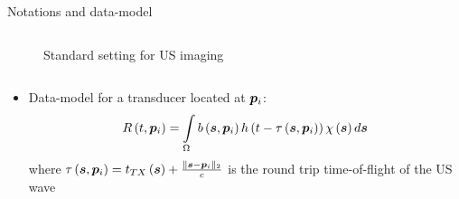 {\begin{block}{Notations and data-model}
\begin{columns}
		\begin{column}{.43\textwidth} %
			\centering
			\begin{figure}
				{\footnotesize
					}
				\caption{Standard setting for US imaging}
			\end{figure}
		\end{column}
	\end{columns} %
	
	\begin{itemize}
		\item Data-model for a transducer located at $\bm{p}_i$:
		\begin{equation*}
			R \left(t, \bm{p}_i\right) = \int \limits_{\Omega} b \left(\bm{s}, \bm{p}_i\right) h \left(t - \tau \left(\bm{s}, \bm{p}_i\right)\right) \chi \left(\bm{s}\right) d \bm{s}
		\end{equation*}
		where $\tau \left(\bm{s}, \bm{p}_i\right) = t_{TX} \left(\bm{s}\right) + \frac{\| \bm{s} - \bm{p}_i \|_2}{c}$ is the round trip time-of-flight of the US wave 
	\end{itemize}
	
\end{block}
\vfill 


}
